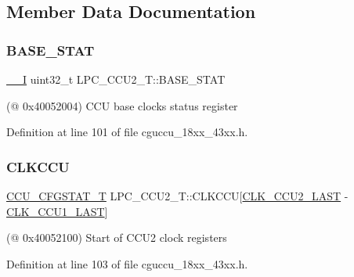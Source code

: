 \subsection{Member Data Documentation}
\mbox{\label{struct_l_p_c___c_c_u2___t_ae3e9e6d8a8300207c871459a610cdeba}} 
\subsubsection{\texorpdfstring{B\+A\+S\+E\+\_\+\+S\+T\+AT}{BASE\_STAT}}
{\footnotesize\ttfamily \hyperlink{core__sc300_8h_af63697ed9952cc71e1225efe205f6cd3}{\+\_\+\+\_\+I} uint32\+\_\+t L\+P\+C\+\_\+\+C\+C\+U2\+\_\+\+T\+::\+B\+A\+S\+E\+\_\+\+S\+T\+AT}

(@ 0x40052004) C\+CU base clocks status register 

Definition at line 101 of file cguccu\+\_\+18xx\+\_\+43xx.\+h.

\mbox{\label{struct_l_p_c___c_c_u2___t_a5ebb8c88a4974448db291ac14796e845}} 
\subsubsection{\texorpdfstring{C\+L\+K\+C\+CU}{CLKCCU}}
{\footnotesize\ttfamily \hyperlink{struct_c_c_u___c_f_g_s_t_a_t___t}{C\+C\+U\+\_\+\+C\+F\+G\+S\+T\+A\+T\+\_\+T} L\+P\+C\+\_\+\+C\+C\+U2\+\_\+\+T\+::\+C\+L\+K\+C\+CU\mbox{[}\hyperlink{chip__clocks_8h_a500a6084ba2d6361fa16b75205a8a513a5623cc59964cc18fc2717e74b819071a}{C\+L\+K\+\_\+\+C\+C\+U2\+\_\+\+L\+A\+ST} -\/ \hyperlink{chip__clocks_8h_a500a6084ba2d6361fa16b75205a8a513af43f3366ad619d1ac63ac44a6efc0343}{C\+L\+K\+\_\+\+C\+C\+U1\+\_\+\+L\+A\+ST}\mbox{]}}

(@ 0x40052100) Start of C\+C\+U2 clock registers 

Definition at line 103 of file cguccu\+\_\+18xx\+\_\+43xx.\+h.

\mbox{\label{struct_l_p_c___c_c_u2___t_a994d8116ca6b9af03eb8568c479aff0c}} 
